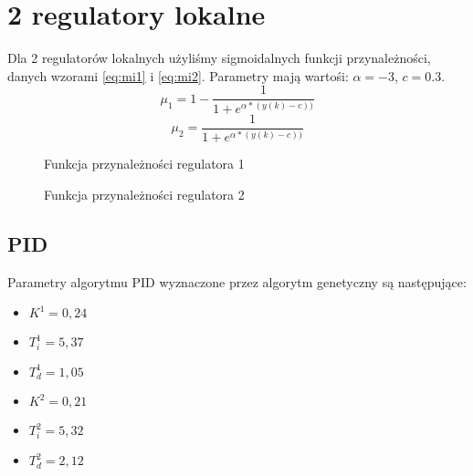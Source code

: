 \section{2 regulatory lokalne}
Dla 2 regulatorów lokalnych użyliśmy sigmoidalnych funkcji przynależności, danych wzorami \ref{eq:mi1} i \ref{eq:mi2}. Parametry mają wartośi: $\alpha = -3$, $c = 0.3$.
\begin{equation} \label{eq:mi1}
\mu_1 = 1 - \frac{1}{1+e^{\alpha * (y(k)-c))}}
\end{equation}
\begin{equation} \label{eq:mi2}
\mu_2 = \frac{1}{1+e^{\alpha * (y(k)-c))}}
\end{equation}

\begin{figure}[H]
\centering
{}
\caption{Funkcja przynależności regulatora 1}
\label{fig:mi2_1}
\end{figure}

\begin{figure}[H]
\centering
{}
\caption{Funkcja przynależności regulatora 2}
\label{fig:mi2_2}
\end{figure}

\subsection{PID}
Parametry algorytmu PID wyznaczone przez algorytm genetyczny są następujące:
\begin{itemize}
\item $K^1 = 0,24$
\item $T^1_i = 5,37$
\item $T^1_d = 1,05$
\\
\item $K^2 = 0,21$
\item $T^2_i = 5,32$
\item $T^2_d = 2,12$
\end{itemize}

